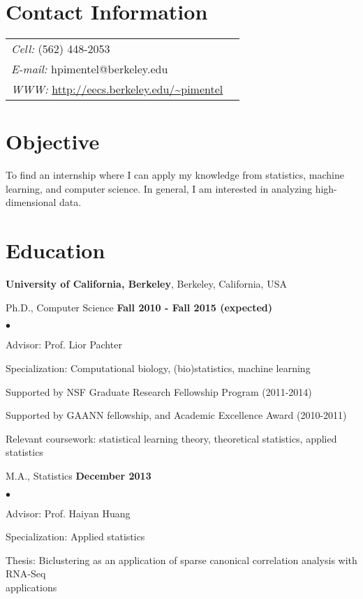 \documentclass[margin,line]{res}
\newenvironment{list2}{
  \begin{list}{$\bullet$}{%
      \setlength{\itemsep}{0in}
      \setlength{\parsep}{0in} \setlength{\parskip}{0in}
      \setlength{\topsep}{0in} \setlength{\partopsep}{0in} 
      \setlength{\leftmargin}{0.2in}}}{\end{list}}
\begin{document}

\begin{resume}
\section{\sc Contact Information}
\vspace{.05in}
\begin{tabular}{@{}p{4in}p{2in}}
 {\it Cell:}  (562) 448-2053 & \\
 {\it E-mail:}  hpimentel@berkeley.edu & \\       
 {\it WWW:} \url{http://eecs.berkeley.edu/~pimentel} &
\end{tabular}

\section{\sc Objective} 
To find an internship where I can apply my knowledge from statistics, machine
learning, and computer science. In general, I am interested in analyzing
high-dimensional data.

\section{\sc Education}
{\bf University of California, Berkeley}, Berkeley, California, USA

\vspace{-.3cm}
Ph.D., Computer Science \hfill {\bf
  Fall 2010 - Fall 2015 (expected) }\\
\vspace{-.45cm}
\begin{list2}
  \vspace*{1mm}
\item Advisor: Prof. Lior Pachter
\item Specialization: Computational biology, (bio)statistics, machine learning
\item Supported by NSF Graduate Research Fellowship Program (2011-2014)
\item Supported by GAANN fellowship, and Academic Excellence Award (2010-2011)
\item Relevant coursework: statistical learning theory, theoretical statistics, applied statistics
\end{list2}

M.A., Statistics \hfill {\bf
 December 2013}\\
\vspace{-.45cm}
\begin{list2}
\vspace*{1mm}
\item Advisor: Prof. Haiyan Huang
\item Specialization: Applied statistics
\item Thesis: Biclustering as an application of sparse canonical correlation analysis with RNA-Seq \\applications
\end{list2}



\end{resume}
\end{document}
